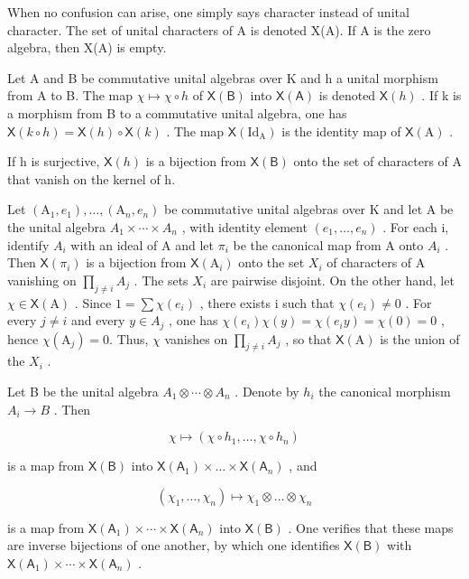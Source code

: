 When no confusion can arise, one simply says character instead of unital character. The set of unital characters of A is denoted X(A). If A is the zero algebra, then X(A) is empty.

Let A and B be commutative unital algebras over K and h a unital morphism from A to B. The map \(\chi \mapsto \chi \circ h\) of \(\mathsf{X}(\mathsf{B})\) into \(\mathsf{X}(\mathsf{A})\) is denoted \(\mathsf{X}(h)\) . If k is a morphism from B to a commutative unital algebra, one has \(\mathsf{X}(k \circ h) = \mathsf{X}(h) \circ \mathsf{X}(k)\) . The map \(\mathsf{X}(\mathrm{Id}_{\mathrm{A}})\) is the identity map of \(\mathsf{X}(\mathrm{A})\) .

If h is surjective, \(\mathsf{X}(h)\) is a bijection from \(\mathsf{X}(\mathsf{B})\) onto the set of characters of A that vanish on the kernel of h.

Let \((\mathrm{A}_{1},e_{1}),\ldots,(\mathrm{A}_{n},e_{n})\) be commutative unital algebras over K and let A be the unital algebra \(A_{1}\times\cdots\times A_{n}\) , with identity element \((e_{1},\ldots,e_{n})\) . For each i, identify \(A_{i}\) with an ideal of A and let \(\pi_{i}\) be the canonical map from A onto \(A_{i}\) . Then \(\mathsf{X}(\pi_{i})\) is a bijection from \(\mathsf{X}(\mathrm{A}_{i})\) onto the set \(X_{i}\) of characters of A vanishing on \(\prod_{j\neq i}A_{j}\) . The sets \(X_{i}\) are pairwise disjoint. On the other hand, let \(\chi\in\mathsf{X}(\mathrm{A})\) . Since \(1=\sum\chi(e_{i})\) , there exists i such that \(\chi(e_{i})\neq0\) . For every \(j\neq i\) and every \(y\in A_{j}\) , one has \(\chi(e_{i})\chi(y)=\chi(e_{i}y)=\chi(0)=0\) , hence \(\chi(\mathrm{A}_{j})=0\). Thus, \(\chi\) vanishes on \(\prod_{j\neq i}A_{j}\) , so that \(\mathsf{X}(\mathrm{A})\) is the union of the \(X_{i}\) .

Let B be the unital algebra \(A_{1} \otimes \cdots \otimes A_{n}\) . Denote by \(h_{i}\) the canonical morphism \(A_{i} \to B\) . Then

\[
\chi \mapsto (\chi \circ h _ {1}, \dots , \chi \circ h _ {n})
\]

is a map from \(\mathsf{X}(\mathsf{B})\) into \(\mathsf{X}(\mathsf{A}_1)\times \dots \times \mathsf{X}(\mathsf{A}_n)\) , and

\[
\left(\chi_ {1}, \dots , \chi_ {n}\right) \mapsto \chi_ {1} \otimes \dots \otimes \chi_ {n}
\]

is a map from \(\mathsf{X}(\mathsf{A}_{1}) \times \cdots \times \mathsf{X}(\mathsf{A}_{n})\) into \(\mathsf{X}(\mathsf{B})\) . One verifies that these maps are inverse bijections of one another, by which one identifies \(\mathsf{X}(\mathsf{B})\) with \(\mathsf{X}(\mathsf{A}_{1}) \times \cdots \times \mathsf{X}(\mathsf{A}_{n})\) .

